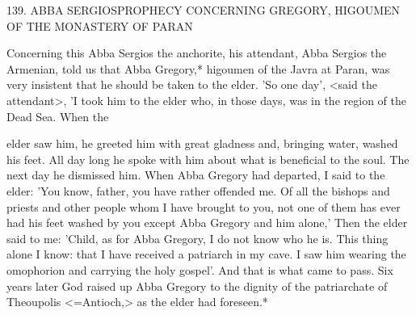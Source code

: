 139.
ABBA SERGIOS\textquotesingle  PROPHECY
CONCERNING GREGORY,
HIGOUMEN OF THE MONASTERY OF PARAN

Concerning this Abba Sergios the anchorite, his attendant, Abba
Sergios the Armenian, told us that Abba Gregory,* higoumen of the
Javra at Paran, was very insistent that he should be taken to the
elder.
'So one day', <said the attendant>, 'I took him to the elder
who, in those days, was in the region of the Dead Sea.
When the

elder saw him, he greeted him with great gladness and, bringing
water, washed his feet.
All day long he spoke with him about what
is beneficial to the soul.
The next day he dismissed him.
When Abba
Gregory had departed, I said to the elder: 'You know, father, you
have rather offended me.
Of all the bishops and priests and other
people whom I have brought to you, not one of them has ever had
his feet washed by you except Abba Gregory and him alone,' Then
the elder said to me: 'Child, as for Abba Gregory, I do not know
who he is.
This thing alone I know: that I have received a patriarch
in my cave.
I saw him wearing the omophorion and carrying the
holy gospel'.
And that is what came to pass.
Six years later God
raised up Abba Gregory to the dignity of the patriarchate of
Theoupolis <=Antioch,> as the elder had foreseen.*

